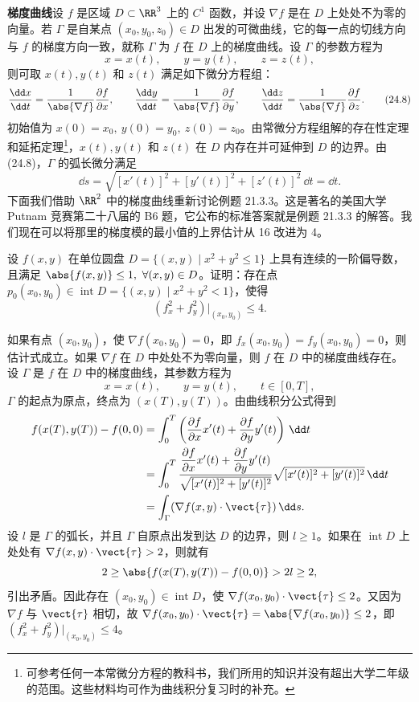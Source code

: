 \textbf{梯度曲线}\quad 设 $f$ 是区域 $D\subset\RR^3$ 上的 $C^1$ 函数，并设 $\nabla f$ 是在 $D$ 上处处不为零的向量。若 $\Gamma$ 是自某点 $(x_0,y_0,z_0)\in D$ 出发的可微曲线，它的每一点的切线方向与 $f$ 的梯度方向一致，就称 $\Gamma$ 为 $f$ 在 $D$ 上的梯度曲线。设 $\Gamma$ 的参数方程为
\[
  x=x(t),\qquad y=y(t),\qquad z=z(t),
\]
则可取 $x(t),y(t)$ 和 $z(t)$ 满足如下微分方程组：
\begin{equation}
  \frac{\dd x}{\dd t}=\frac1{\abs{\nabla f}}\frac{\partial f}{\partial x},\qquad
  \frac{\dd y}{\dd t}=\frac1{\abs{\nabla f}}\frac{\partial f}{\partial y},\qquad
  \frac{\dd z}{\dd t}=\frac1{\abs{\nabla f}}\frac{\partial f}{\partial z}.
  \tag{24.8}
  \label{eq:24.8}
\end{equation}
初始值为 $x(0)=x_0,\ y(0)=y_0,\ z(0)=z_0$。由常微分方程组解的存在性定理和延拓定理\footnote{可参考任何一本常微分方程的教科书，我们所用的知识并没有超出大学二年级的范围。这些材料均可作为曲线积分复习时的补充。}，$x(t),y(t)$ 和 $z(t)$ 在 $D$ 内存在并可延伸到 $D$ 的边界。由 (24.8)，$\Gamma$ 的弧长微分满足
\[
  \dd s=\sqrt{[x'(t)]^2+[y'(t)]^2+[z'(t)]^2}\,\dd t=\dd t.
\]
下面我们借助 $\RR^2$ 中的梯度曲线重新讨论例题 21.3.3。这是著名的美国大学 Putnam 竞赛第二十八届的 B6 题，它公布的标准答案就是例题 21.3.3 的解答。我们现在可以将那里的梯度模的最小值的上界估计从 16 改进为 4。

\begin{xexample}[24.2.4]
设 $f(x,y)$ 在单位圆盘 $D=\{(x,y)\mid x^2+y^2\le1\}$ 上具有连续的一阶偏导数，且满足 $\abs{f(x,y)}\le1,\ \forall(x,y)\in D$。证明：存在点 $p_0(x_0,y_0)\in\operatorname{int}D=\{(x,y)\mid x^2+y^2<1\}$，使得
\[
  (f_x^2+f_y^2)|_{(x_0,y_0)}\le4.
\]
\end{xexample}
\begin{xproof}
如果有点 $(x_0,y_0)$，使 $\nabla f(x_0,y_0)=0$，即 $f_x(x_0,y_0)=f_y(x_0,y_0)=0$，则估计式成立。如果 $\nabla f$ 在 $D$ 中处处不为零向量，则 $f$ 在 $D$ 中的梯度曲线存在。设 $\Gamma$ 是 $f$ 在 $D$ 中的梯度曲线，其参数方程为
\[
  x=x(t),\qquad y=y(t),\qquad t\in[0,T],
\]
$\Gamma$ 的起点为原点，终点为 $(x(T),y(T))$。由曲线积分公式得到
\begin{align*}
  f(x(T),y(T))-f(0,0)
  &=\int_0^T\left(\frac{\partial f}{\partial x}x'(t)+\frac{\partial f}{\partial y}y'(t)\right)\,\dd t\\
  &=\int_0^T\frac{\dfrac{\partial f}{\partial x}x'(t)+\dfrac{\partial f}{\partial y}y'(t)}{\sqrt{[x'(t)]^2+[y'(t)]^2}}\sqrt{[x'(t)]^2+[y'(t)]^2}\,\dd t\\
  &=\int_\Gamma(\nabla f(x,y)\cdot\vect{\tau})\,\dd s.
\end{align*}
设 $l$ 是 $\Gamma$ 的弧长，并且 $\Gamma$ 自原点出发到达 $D$ 的边界，则 $l\ge1$。如果在 $\operatorname{int}D$ 上处处有 $\nabla f(x,y)\cdot\vect{\tau}>2$，则就有
\[
  2\ge\abs{f(x(T),y(T))-f(0,0)}>2l\ge2,
\]
引出矛盾。因此存在 $(x_0,y_0)\in\operatorname{int}D$，使 $\nabla f(x_0,y_0)\cdot\vect{\tau}\le2$。又因为 $\nabla f$ 与 $\vect{\tau}$ 相切，故 $\nabla f(x_0,y_0)\cdot\vect{\tau}=\abs{\nabla f(x_0,y_0)}\le2$，即 $(f_x^2+f_y^2)|_{(x_0,y_0)}\le4$。
\end{xproof}

